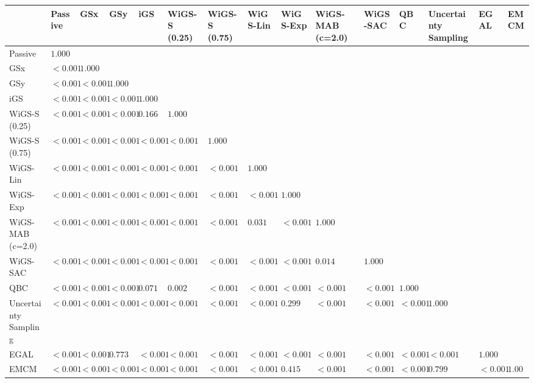 \begin{tabular}{lllllllllllllll}
\toprule
 & Passive & GSx & GSy & iGS & WiGS-S (0.25) & WiGS-S (0.75) & WiGS-Lin & WiGS-Exp & WiGS-MAB (c=2.0) & WiGS-SAC & QBC & Uncertainty Sampling & EGAL & EMCM \\
\midrule
Passive & $1.000$ &  &  &  &  &  &  &  &  &  &  &  &  &  \\
GSx & $<0.001$ & $1.000$ &  &  &  &  &  &  &  &  &  &  &  &  \\
GSy & $<0.001$ & $<0.001$ & $1.000$ &  &  &  &  &  &  &  &  &  &  &  \\
iGS & $<0.001$ & $<0.001$ & $<0.001$ & $1.000$ &  &  &  &  &  &  &  &  &  &  \\
WiGS-S (0.25) & $<0.001$ & $<0.001$ & $<0.001$ & $0.166$ & $1.000$ &  &  &  &  &  &  &  &  &  \\
WiGS-S (0.75) & $<0.001$ & $<0.001$ & $<0.001$ & $<0.001$ & $<0.001$ & $1.000$ &  &  &  &  &  &  &  &  \\
WiGS-Lin & $<0.001$ & $<0.001$ & $<0.001$ & $<0.001$ & $<0.001$ & $<0.001$ & $1.000$ &  &  &  &  &  &  &  \\
WiGS-Exp & $<0.001$ & $<0.001$ & $<0.001$ & $<0.001$ & $<0.001$ & $<0.001$ & $<0.001$ & $1.000$ &  &  &  &  &  &  \\
WiGS-MAB (c=2.0) & $<0.001$ & $<0.001$ & $<0.001$ & $<0.001$ & $<0.001$ & $<0.001$ & $0.031$ & $<0.001$ & $1.000$ &  &  &  &  &  \\
WiGS-SAC & $<0.001$ & $<0.001$ & $<0.001$ & $<0.001$ & $<0.001$ & $<0.001$ & $<0.001$ & $<0.001$ & $0.014$ & $1.000$ &  &  &  &  \\
QBC & $<0.001$ & $<0.001$ & $<0.001$ & $0.071$ & $0.002$ & $<0.001$ & $<0.001$ & $<0.001$ & $<0.001$ & $<0.001$ & $1.000$ &  &  &  \\
Uncertainty Sampling & $<0.001$ & $<0.001$ & $<0.001$ & $<0.001$ & $<0.001$ & $<0.001$ & $<0.001$ & $0.299$ & $<0.001$ & $<0.001$ & $<0.001$ & $1.000$ &  &  \\
EGAL & $<0.001$ & $<0.001$ & $0.773$ & $<0.001$ & $<0.001$ & $<0.001$ & $<0.001$ & $<0.001$ & $<0.001$ & $<0.001$ & $<0.001$ & $<0.001$ & $1.000$ &  \\
EMCM & $<0.001$ & $<0.001$ & $<0.001$ & $<0.001$ & $<0.001$ & $<0.001$ & $<0.001$ & $0.415$ & $<0.001$ & $<0.001$ & $<0.001$ & $0.799$ & $<0.001$ & $1.000$ \\
\bottomrule
\end{tabular}
